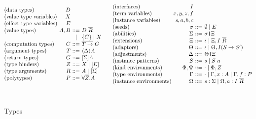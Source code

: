 \documentclass[msc,deptreport,cs]{infthesis} %
\makeatletter
\newcommand{\many}{\overline}
\newcommand\ba{\begin{array}}
\newcommand\ea{\end{array}}
\newenvironment{syn}{\ba{@{}l@{~}r@{~}c@{~}l@{}}}{\ea}
\newcommand{\adj}{\Delta}
\newcommand{\adapt}{\Theta}
\newcommand{\ext}{\Xi}
\newcommand{\sigs}{\Sigma}
\newcommand{\sig}{I}
\newcommand{\seed}{\sigma}
\newcommand{\var}{\mathit}        %
\newcommand{\thunk}[1]{\{{#1}\}}
\newcommand{\snoc}{\ }
\newcommand{\slab}[1]{(\textrm{#1})}
\newcommand{\ev}{E}
\newcommand{\effin}[1]{\langle {#1} \rangle}
\newcommand{\effout}[1]{[{#1}]}
\newcommand{\nowt}{\emptyset}
\newcommand{\id}{\iota}
\newcommand{\pid}{\var{s}} %
\newcommand{\kenv}{\Phi}  %
\newcommand{\kenva}{\Psi} %
\newcommand{\ienv}{\Omega} %
\newcommand{\gor}{\mid}
\newcommand{\pipe}{\texttt{|}}
\makeatother
\begin{document}
\begin{figure}  %
\[
\ba{@{}c@{}}
\ba{@{}c@{\quad\quad}c@{}}
\begin{syn}
  \slab{data types}            & D \\
  \slab{value type variables}  & X \\
  \slab{effect type variables} & E \\
  \slab{value types}           & A, B   &::= & D~\overline{R} \\
                               &        &\gor& \thunk{C} \gor X \\
  \slab{computation types}     & C      &::= & \many{T \to}~G \\
  \slab{argument types}        & T      &::= & \effin{\adj}A \\
  \slab{return types}          & G      &::= & \effout{\sigs}A \\

  \slab{type binders}          & Z      &::= & X \gor [E]\\
  \slab{type arguments}        & R      &::= & A \gor [\Sigma]\\
  \slab{polytypes}             & P      &::= & \forall \overline{Z}.A \\
\end{syn}
&
\begin{syn}
  \slab{interfaces}           & I \\
  \slab{term variables}       & x, y, z, f \\
  \slab{instance variables}   & \pid, a, b, c \\
  \slab{seeds}                & \seed  &::= & \nowt \gor \ev \\
  \slab{abilities}            & \sigs  &::= & \seed\pipe\ext \\
  \slab{extensions}           & \ext   &::= & \id \gor \ext, \sig~\many{R} \\
  \slab{adaptors}             & \adapt &::= & \id \gor \adapt, \sig(S \to S') \\
  \slab{adjustments}          & \adj   &::= & \adapt\pipe\ext \\
  \slab{instance patterns}    & S      &::= & \pid \gor S \snoc a \\
  \slab{kind environments}    & \kenv,
                                \kenva &::= & \cdot \gor \kenv, Z \\
  \slab{type environments}    & \Gamma &::= & \cdot \gor \Gamma, x:A %
                                              \gor \Gamma, f:P\\
 \slab{instance environments} & \ienv  &::= & \pid:\sigs \gor \ienv, a:\sig~\many{R}\\
\end{syn} \\
\ea \\
\ea
\]
\\[0.25cm]

\caption{Types}
\label{fig:types}
\end{figure}
\end{document}
